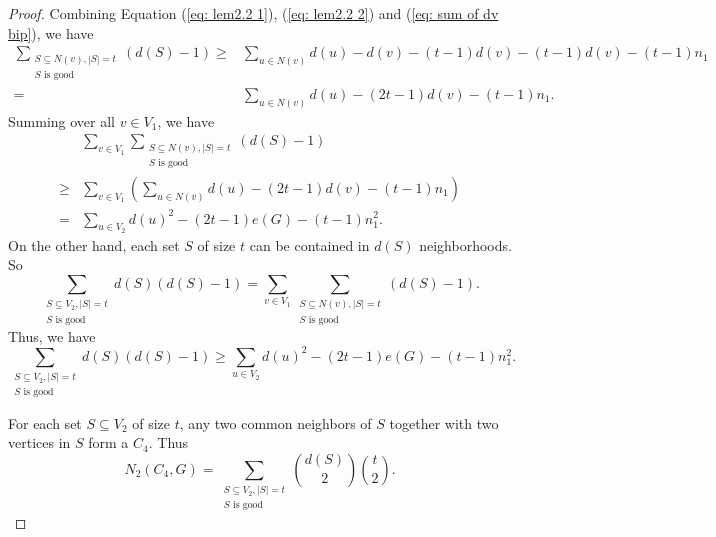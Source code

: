 \documentclass[10pt,a4paper]{amsart}
\begin{document}
\begin{proof}
            Combining Equation (\ref{eq: lem2.2 1}), (\ref{eq: lem2.2 2}) and (\ref{eq: sum of dv bip}), we have
            \begin{equation*}
                \begin{aligned}
                \sum_{\substack{S \subseteq N(v), |S| = t \\ S \text{ is good}}} (d(S) - 1)
                \geq& \sum_{u \in N(v)} d(u) - d(v) - (t-1) d(v) - (t-1) d(v) - (t-1) n_1 \\
                = & \sum_{u \in N(v)} d(u) - (2t-1) d(v) - (t-1) n_1.
                \end{aligned}
            \end{equation*}
            Summing over all $v \in V_1$, we have
            \begin{equation*}
                \begin{aligned}
                    & \sum_{v \in V_1} \sum_{\substack{S \subseteq N(v), |S| = t \\ S \text{ is good}}} (d(S) - 1) \\
                    \geq& \sum_{v \in V_1} \left(\sum_{u \in N(v)} d(u) - (2t-1) d(v) - (t-1) n_1 \right) \\
                    =& \sum_{u \in V_2} d(u)^2 - (2t-1) e(G) - (t-1) n_1^2.
                \end{aligned}
            \end{equation*}
            On the other hand, each set $S$ of size $t$ can be contained in $d(S)$ neighborhoods. So
            \begin{equation*}
                \sum_{\substack{S \subseteq V_2, |S| = t \\ S \text{ is good}}} d(S)(d(S) - 1) = \sum_{v \in V_1} \sum_{\substack{S \subseteq N(v), |S| = t \\ S \text{ is good}}} (d(S) - 1).
            \end{equation*}
            Thus, we have
            \begin{equation}\label{eq: lower bound of number of C4 1}
                \sum_{\substack{S \subseteq V_2, |S| = t \\ S \text{ is good}}} d(S)(d(S) - 1) \geq \sum_{u \in V_2} d(u)^2 - (2t-1) e(G) - (t-1) n_1^2.
            \end{equation}

            For each set $S \subseteq V_2$ of size $t$, any two common neighbors of $S$ together with two vertices in $S$ form a $C_4$.
            Thus
            \begin{equation}\label{eq: sum of dv 2}
                N_2 (C_4, G) = \sum_{\substack{S \subseteq V_2, |S| = t \\ S \text{ is good}}} \binom{d(S)}{2} \binom{t}{2}.
            \end{equation}


\end{proof}
\end{document}
